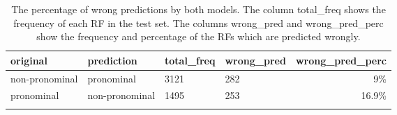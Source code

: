\begin{table}
\begin{tabularx}{\textwidth}{llYYr}
  \lsptoprule
original & prediction & total\_freq & wrong\_pred & wrong\_pred\_perc \\ 
  \midrule
non-pronominal & pronominal & 3121 & 282 & 9\% \\ 
  pronominal & non-pronominal & 1495 & 253 & 16.9\% \\ 
   \lspbottomrule
\end{tabularx}
\caption[The percentage of wrong predictions by both models.]{The percentage of wrong predictions by both models. The column total\_freq shows the frequency of each RF in the test set. The columns wrong\_pred and wrong\_pred\_perc show the frequency and percentage of the RFs which are predicted wrongly.} 
\label{tab:wrongCases}
\end{table}
